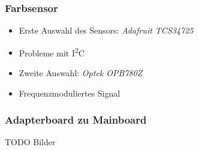 \begin{frame}
	\frametitle{Farbsensor}
	
	\begin{itemize}
		\item Erste Auswahl des Sensors: \textit{Adafruit TCS34725}
		\item Probleme mit I\textsuperscript{2}C
		\item Zweite Auswahl: \textit{Optek OPB780Z}
		\item Frequenzmoduliertes Signal
	\end{itemize}
	
\end{frame}

\begin{frame}
	
	
	\frametitle{Adapterboard zu Mainboard}
	
	TODO Bilder
	
\end{frame}